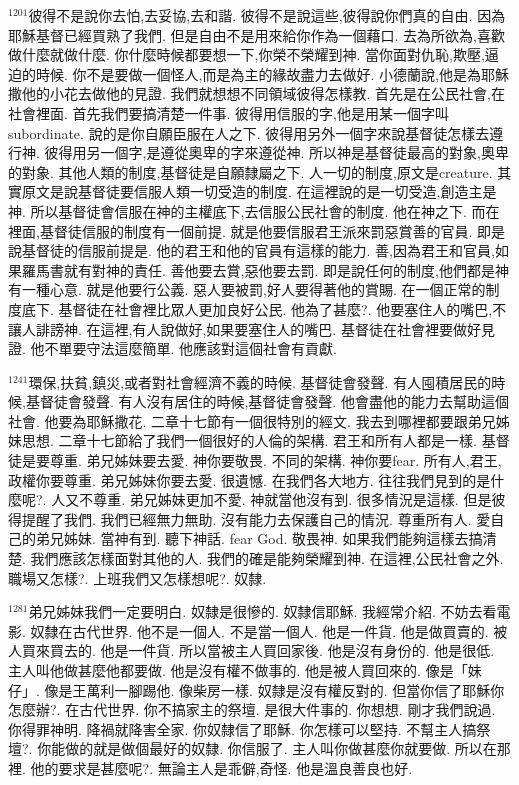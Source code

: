 \documentclass{book}
\begin{document}
$^{1201}$彼得不是說你去怕,去妥協,去和諧.
彼得不是說這些,彼得說你們真的自由.
因為耶穌基督已經買熟了我們.
但是自由不是用來給你作為一個藉口.
去為所欲為,喜歡做什麼就做什麼.
你什麼時候都要想一下,你榮不榮耀到神.
當你面對仇恥,欺壓,逼迫的時候.
你不是要做一個怪人,而是為主的緣故盡力去做好.
小德蘭說,他是為耶穌撒他的小花去做他的見證.
我們就想想不同領域彼得怎樣教.
首先是在公民社會,在社會裡面.
首先我們要搞清楚一件事.
彼得用信服的字,他是用某一個字叫subordinate.
說的是你自願臣服在人之下.
彼得用另外一個字來說基督徒怎樣去遵行神.
彼得用另一個字,是遵從奧卑的字來遵從神.
所以神是基督徒最高的對象,奧卑的對象.
其他人類的制度,基督徒是自願隸屬之下.
人一切的制度,原文是creature.
其實原文是說基督徒要信服人類一切受造的制度.
在這裡說的是一切受造,創造主是神.
所以基督徒會信服在神的主權底下,去信服公民社會的制度.
他在神之下.
而在裡面,基督徒信服的制度有一個前提.
就是他要信服君王派來罰惡賞善的官員.
即是說基督徒的信服前提是.
他的君王和他的官員有這樣的能力.
善,因為君王和官員,如果羅馬書就有對神的責任.
善他要去賞,惡他要去罰.
即是說任何的制度,他們都是神有一種心意.
就是他要行公義.
惡人要被罰,好人要得著他的賞賜.
在一個正常的制度底下.
基督徒在社會裡比眾人更加良好公民.
他為了甚麼?.
他要塞住人的嘴巴,不讓人誹謗神.
在這裡,有人說做好,如果要塞住人的嘴巴.
基督徒在社會裡要做好見證.
他不單要守法這麼簡單.
他應該對這個社會有貢獻.

$^{1241}$環保,扶貧,鎮災,或者對社會經濟不義的時候.
基督徒會發聲.
有人囤積居民的時候,基督徒會發聲.
有人沒有居住的時候,基督徒會發聲.
他會盡他的能力去幫助這個社會.
他要為耶穌撒花.
二章十七節有一個很特別的經文.
我去到哪裡都要跟弟兄姊妹思想.
二章十七節給了我們一個很好的人倫的架構.
君王和所有人都是一樣.
基督徒是要尊重.
弟兄姊妹要去愛.
神你要敬畏.
不同的架構.
神你要fear.
所有人,君王,政權你要尊重.
弟兄姊妹你要去愛.
很遺憾.
在我們各大地方.
往往我們見到的是什麼呢?.
人又不尊重.
弟兄姊妹更加不愛.
神就當他沒有到.
很多情況是這樣.
但是彼得提醒了我們.
我們已經無力無助.
沒有能力去保護自己的情況.
尊重所有人.
愛自己的弟兄姊妹.
當神有到.
聽下神話.
fear God.
敬畏神.
如果我們能夠這樣去搞清楚.
我們應該怎樣面對其他的人.
我們的確是能夠榮耀到神.
在這裡,公民社會之外.
職場又怎樣?.
上班我們又怎樣想呢?.
奴隸.

$^{1281}$弟兄姊妹我們一定要明白.
奴隸是很慘的.
奴隸信耶穌.
我經常介紹.
不妨去看電影.
奴隸在古代世界.
他不是一個人.
不是當一個人.
他是一件貨.
他是做買賣的.
被人買來買去的.
他是一件貨.
所以當被主人買回家後.
他是沒有身份的.
他是很低.
主人叫他做甚麼他都要做.
他是沒有權不做事的.
他是被人買回來的.
像是「妹仔」.
像是王萬利一腳踢他.
像柴房一樣.
奴隸是沒有權反對的.
但當你信了耶穌你怎麼辦?.
在古代世界.
你不搞家主的祭壇.
是很大件事的.
你想想.
剛才我們說過.
你得罪神明.
降禍就降害全家.
你奴隸信了耶穌.
你怎樣可以堅持.
不幫主人搞祭壇?.
你能做的就是做個最好的奴隸.
你信服了.
主人叫你做甚麼你就要做.
所以在那裡.
他的要求是甚麼呢?.
無論主人是乖僻,奇怪.
他是溫良善良也好.
\end{document}
